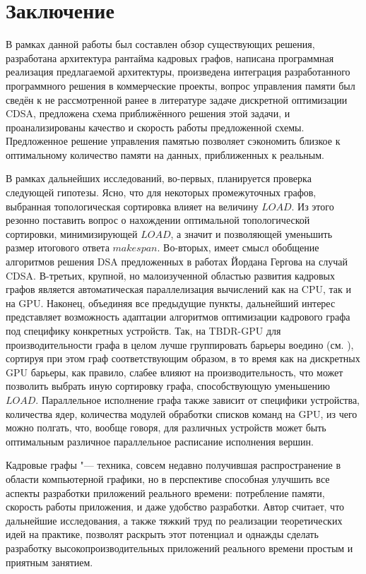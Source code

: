 \section{Заключение}
В рамках данной работы был составлен обзор существующих решения, разработана архитектура рантайма кадровых графов, написана программная реализация предлагаемой архитектуры, произведена интеграция разработанного программного решения в коммерческие проекты, вопрос управления памяти был сведён к не рассмотренной ранее в литературе задаче дискретной оптимизации CDSA, предложена схема приближённого решения этой задачи, и проанализированы качество и скорость работы предложенной схемы.
Предложенное решение управления памятью позволяет сэкономить близкое к оптимальному количество памяти на данных, приближенных к реальным.

В рамках дальнейших исследований, во-первых, планируется проверка следующей гипотезы.
Ясно, что для некоторых промежуточных графов, выбранная топологическая сортировка влияет на величину $LOAD$.
Из этого резонно поставить вопрос о нахождении оптимальной топологической сортировки, минимизирующей $LOAD$, а значит и позволяющей уменьшить размер итогового ответа $makespan$.
Во-вторых, имеет смысл обобщение алгоритмов решения DSA предложенных в работах Йордана Гергова \cite{gergov_approximation_1996, gergov_algorithms_1999} на случай CDSA.
В-третьих, крупной, но малоизученной областью развития кадровых графов является автоматическая параллелизация вычислений как на CPU, так и на GPU.
Наконец, объединяя все предыдущие пункты, дальнейший интерес представляет возможность адаптации алгоритмов оптимизации кадрового графа под специфику конкретных устройств. Так, на TBDR-GPU для производительности графа в целом лучше группировать барьеры воедино (см. \cite{GraniteBlogPost}), сортируя при этом граф соответствующим образом, в то время как на дискретных GPU барьеры, как правило, слабее влияют на производительность, что может позволить выбрать иную сортировку графа, способствующую уменьшению $LOAD$. Параллельное исполнение графа также зависит от специфики устройства, количества ядер, количества модулей обработки списков команд на GPU, из чего можно полгать, что, вообще говоря, для различных устройств может быть оптимальным различное параллельное расписание исполнения вершин.

Кадровые графы "--- техника, совсем недавно получившая распространение в области компьютерной графики, но в перспективе способная улучшить все аспекты разработки приложений реального времени: потребление памяти, скорость работы приложения, и даже удобство разработки. Автор считает, что дальнейшие исследования, а также тяжкий труд по реализации теоретических идей на практике, позволят раскрыть этот потенциал и однажды сделать разработку высокопроизводительных приложений реального времени простым и приятным занятием.
